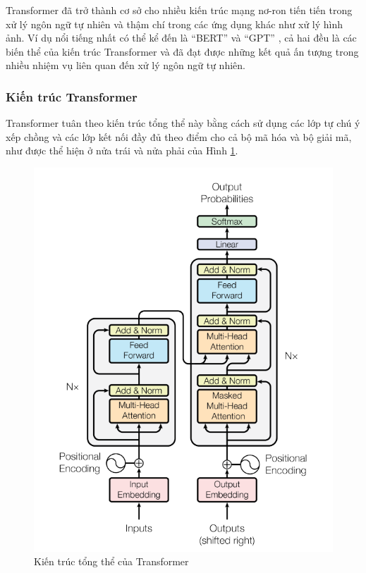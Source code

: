 Transformer đã trở thành cơ sở cho nhiều kiến trúc mạng nơ-ron tiến tiến trong xử lý ngôn ngữ tự nhiên và thậm chí trong các ứng dụng khác như xử lý hình ảnh. Ví dụ nổi tiếng nhất có thể kể đến là ``BERT'' và ``GPT'' , cả hai đều là các biến thể của kiến trúc Transformer và đã đạt được những kết quả ấn tượng trong nhiều nhiệm vụ liên quan đến xử lý ngôn ngữ tự nhiên.

\subsubsection*{Kiến trúc Transformer}
Transformer tuân theo kiến trúc tổng thể này bằng cách sử dụng các lớp tự chú ý xếp chồng và các lớp kết nối đầy đủ theo điểm cho cả bộ mã hóa và bộ giải mã, như được thể hiện ở nửa trái và nửa phải của Hình \ref{fig3}. 
\begin{figure}[h]
    \includegraphics[scale=0.65]{images/transformer-architecture.png}
    \centering
    \caption{Kiến trúc tổng thể của Transformer \cite{vaswani2023attention}}
    \label{fig3}
\end{figure}

